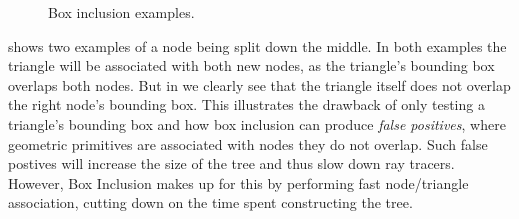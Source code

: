 \begin{figure}
  \centering {}
  \caption{Box inclusion examples.}
  \label{fig:boxInclusion}
\end{figure}


 shows two examples of a node being split down the
middle. In both examples the triangle will be associated with both new nodes, as
the triangle's bounding box overlaps both nodes. But in
 we clearly see that the triangle itself does not
overlap the right node's bounding box. This illustrates the drawback of only
testing a triangle's bounding box and how box inclusion can produce
\textit{false positives}, where geometric primitives are associated with nodes
they do not overlap. Such false postives will increase the size of the tree and
thus slow down ray tracers. However, Box Inclusion makes up for this by
performing fast node/triangle association, cutting down on the time spent
constructing the tree.









